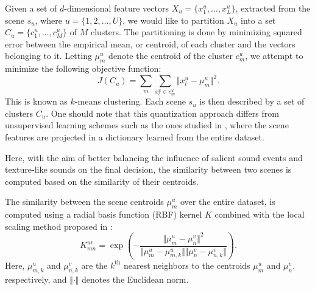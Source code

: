 \documentclass[journal]{IEEEtran}
\newcommand{\ja}[1]{\textcolor{magenta}{Joakim : #1}}
\begin{document}
Given a set of $d$-dimensional feature vectors $X_u = \{x_1^u, \ldots, x_L^u\}$, extracted from the scene $s_u$, where $u=\lbrace 1,2,\ldots,U\rbrace$, we would like to partition $X_u$ into a set $C_u = \{c^u_1, \ldots, c^u_M\}$ of $M$ clusters. The partitioning is done by minimizing squared error between the empirical mean, or centroid, of each cluster and the vectors belonging to it. Letting $\mu_m^u$ denote the centroid of the cluster $c_m^u$, we attempt to minimize the following objective function:
\begin{equation}
J(C_u)=\sum\limits_{m} \sum_{x^u_l\in c^u_m} \Vert x_l^u - \mu_m^u \Vert^2\mbox{.}
\end{equation}
This is known as $k$-means clustering.
Each scene $s_u$ is then described by a set of clusters $C_u$. One should note that this quantization approach differs from unsupervised learning schemes such as the ones studied in \cite{bisot2016acoustic}, where the scene features are projected in a dictionary learned from the entire dataset.


Here, with the aim of better balancing the influence of salient sound events and texture-like sounds on the final decision, the similarity between two scenes is computed based on the similarity of their centroids.

The similarity between the scene centroids $\mu_m^u$ over the entire dataset, is computed using a radial basis function (RBF) kernel $K$ combined with the local scaling method proposed in \cite{selfTuneManor2004}:
\begin{equation}
\label{eq:kc}
K_{mn}^{uv} = \exp\left( - \dfrac{\Vert \mu_m^u - \mu_n^v \Vert^2}{\Vert \mu_m^u - \mu_{m,k}^u \Vert \Vert \mu_n^v - \mu_{n,k}^v \Vert} \right).
\end{equation} 
Here, $\mu_{m,k}^u$ and $\mu_{n,k}^v$ are the $k^{\textrm{th}}$ nearest neighbors to the centroids $\mu_m^u$ and $\mu_n^v$, respectively, and $\Vert \cdot \Vert$ denotes the Euclidean norm.
\end{document}

